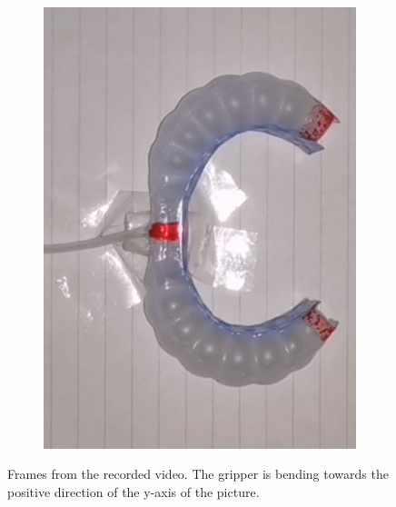 \documentclass[conference]{IEEEtran}
\begin{document}
\begin{figure}[htbp]
\begin{subfigure}[b]{0.25\linewidth}
    \includegraphics[width=\linewidth]{pics/变形3.png}
    \caption{}
    \label{fig:image3}
  \end{subfigure}
  \caption{Frames from the recorded video. The gripper is bending towards the positive direction of the y-axis of the picture.}
  \label{fig:three_images}
\end{figure}
\end{document}
